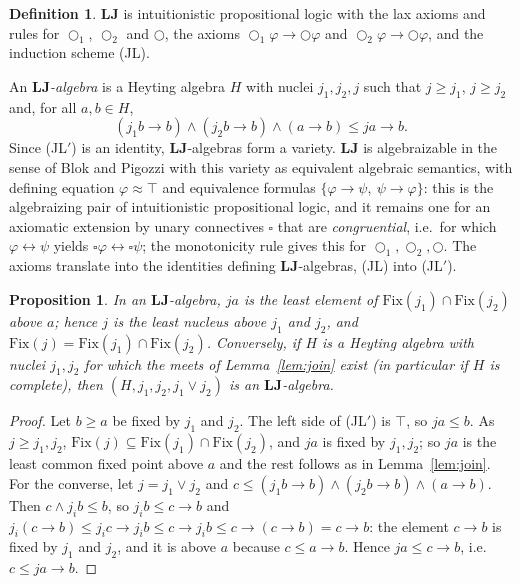 \documentclass[11pt]{amsart}
\newtheorem{prop}[thm]{Proposition}
\theoremstyle{definition}
\newtheorem{defi}[thm]{Definition}
\newcommand{\Fix}{\mathrm{Fix}}
\newcommand{\LLJ}{\mathbf{LJ}}
\newcommand{\lax}{\bigcirc}
\newcommand{\laxa}{\bigcirc_1}
\newcommand{\laxb}{\bigcirc_2}
\begin{document}
\begin{defi}\label{def:LJ}
$\LLJ$ is intuitionistic propositional logic with the lax axioms and rules for
$\laxa$, $\laxb$ and $\lax$, the axioms $\laxa\varphi\to\lax\varphi$ and
$\laxb\varphi\to\lax\varphi$, and the induction scheme (JL).
\end{defi}

An \emph{$\LLJ$-algebra} is a Heyting algebra $H$ with nuclei $j_1,j_2,j$ such
that $j\ge j_1$, $j\ge j_2$ and, for all $a,b\in H$,
\[
(j_1b\to b)\wedge(j_2b\to b)\wedge(a\to b)\le ja\to b.\tag{JL$'$}
\]
Since (JL$'$) is an identity, $\LLJ$-algebras form a variety. $\LLJ$ is
algebraizable in the sense of Blok and Pigozzi \cite{BP} with this variety as
equivalent algebraic semantics, with defining equation $\varphi\approx\top$
and equivalence formulas $\{\varphi\to\psi,\ \psi\to\varphi\}$: this is the
algebraizing pair of intuitionistic propositional logic, and it remains one for
an axiomatic extension by unary connectives $\square$ that are
\emph{congruential}, i.e.\ for which $\varphi\leftrightarrow\psi$ yields
$\square\varphi\leftrightarrow\square\psi$; the monotonicity rule gives this
for $\laxa,\laxb,\lax$. The axioms translate into the identities defining
$\LLJ$-algebras, (JL) into (JL$'$).

\begin{prop}\label{prop:least}
In an $\LLJ$-algebra, $ja$ is the least element of $\Fix(j_1)\cap\Fix(j_2)$
above $a$; hence $j$ is the least nucleus above $j_1$ and $j_2$, and
$\Fix(j)=\Fix(j_1)\cap\Fix(j_2)$. Conversely, if $H$ is a Heyting algebra with
nuclei $j_1,j_2$ for which the meets of Lemma~\ref{lem:join} exist (in
particular if $H$ is complete), then $(H,j_1,j_2,j_1\vee j_2)$ is an
$\LLJ$-algebra.
\end{prop}
\begin{proof}
Let $b\ge a$ be fixed by $j_1$ and $j_2$. The left side of (JL$'$) is $\top$, so
$ja\le b$. As $j\ge j_1,j_2$, $\Fix(j)\subseteq\Fix(j_1)\cap\Fix(j_2)$, and
$ja$ is fixed by $j_1,j_2$; so $ja$ is the least common fixed point above $a$
and the rest follows as in Lemma~\ref{lem:join}. For the converse, let
$j=j_1\vee j_2$ and $c\le(j_1b\to b)\wedge(j_2b\to b)\wedge(a\to b)$. Then
$c\wedge j_ib\le b$, so $j_ib\le c\to b$ and
$j_i(c\to b)\le j_ic\to j_ib\le c\to j_ib\le c\to(c\to b)=c\to b$: the element
$c\to b$ is fixed by $j_1$ and $j_2$, and it is above $a$ because $c\le a\to b$.
Hence $ja\le c\to b$, i.e.\ $c\le ja\to b$.
\end{proof}
\end{document}
